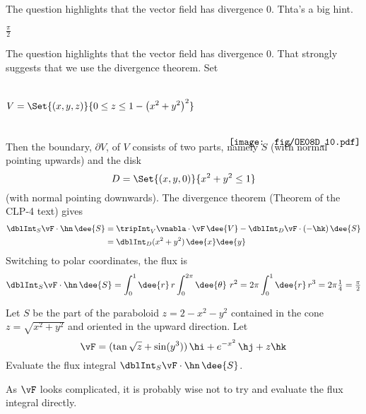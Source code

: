 \begin{hint} 
The question highlights that the vector field has divergence $0$.
Thta's a big hint.
\end{hint}

\begin{answer} 
$\frac{\pi}{2}$
\end{answer}

\begin{solution} 
The question highlights that the vector field has divergence $0$.
That strongly suggests that we use the divergence theorem.
Set
\begin{equation*}
V=\Set{(x,y,z)}{0\le z\le 1-\big(x^2+y^2\big)^2}\hskip0.5in\raisebox{-37pt}[30pt][25pt]
                         {\smash{\texttt{[image: fig/OE08D\_10.pdf]}}}
\end{equation*}
Then the boundary, $\partial V$, of $V$ consists of two parts, namely $S$
(with normal pointing upwards) and the disk
\begin{equation*}
D=\Set{(x,y,0)}{x^2+y^2\le 1}
\end{equation*}
(with normal pointing downwards).  The divergence theorem (Theorem  of the CLP-4 text) 
gives
\begin{align*}
\dblInt_S \vF \cdot \hn\,\dee{S}
&=\tripInt_V \vnabla\cdot\vF\,\dee{V}
    -\dblInt_D \vF \cdot (-\hk)\,\dee{S} \\
&=\dblInt_D (x^2+y^2)\,\dee{x}\dee{y} 
\end{align*}
Switching to polar coordinates, the flux is
\begin{align*}
\dblInt_S \vF\cdot\hn\,\dee{S}
=\int_0^1\dee{r}\,r\int_0^{2\pi}\dee{\theta}\ r^2
=2\pi \int_0^1 \dee{r}\, r^3
=2\pi \tfrac{1}{4}
=\tfrac{\pi}{2}
\end{align*}

\end{solution}

\begin{question}[M317 2008A] %

Let $S$ be the part of the paraboloid $z = 2 - x^2 - y^2$ contained 
in the cone $z = \sqrt{x^2+y^2}$ and oriented in the upward direction. 
Let
\begin{equation*}
\vF = (\tan \sqrt{z} + \sin(y^3))\,\hi + e^{-x^2}\,\hj + z\hk
\end{equation*}
Evaluate the flux integral $\dblInt_S \vF \cdot\hn\,\dee{S}$.
\end{question}

\begin{hint} 
As $\vF$ looks complicated, it is probably wise not to try and evaluate
the flux integral directly.
\end{hint}

